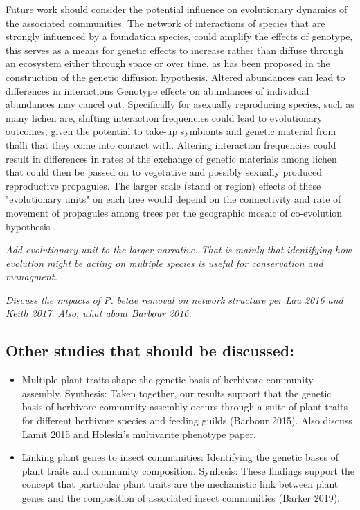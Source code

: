 \documentclass[11pt,twocolumn,twoside,lineno]{pnas-new}
\begin{document}
Future work should consider the potential influence on evolutionary
dynamics of the associated communities. The network of interactions of
species that are strongly influenced by a foundation species, could
amplify the effects of genotype, this serves as a means for genetic
effects to increase rather than diffuse through an ecosystem either
through space or over time, as has been proposed in the construction
of the genetic diffusion hypothesis. Altered abundances can lead to
differences in interactions Genotype effects on abundances of
individual abundances may cancel out. Specifically for asexually
reproducing species, such as many lichen are, shifting interaction
frequencies could lead to evolutionary outcomes, given the potential
to take-up symbionts and genetic material from thalli that they come
into contact with. Altering interaction frequencies could result in
differences in rates of the exchange of genetic materials among lichen
that could then be passed on to vegetative and possibly sexually
produced reproductive propagules. The larger scale (stand or region)
effects of these "evolutionary units" on each tree would depend on the
connectivity and rate of movement of propagules among trees per the
geographic mosaic of co-evolution hypothesis \cite{Barbour2009c,
  Thompson2013}.


\textit{Add evolutionary unit to the larger narrative. That is mainly
  that identifying how evolution might be acting on multiple species
  is useful for conservation and managment.}


\textit{Discuss the impacts of P. betae removal on network structure
  per Lau 2016 and Keith 2017. Also, what about Barbour 2016.}


\subsection*{Other studies that should be discussed:}

\begin{itemize}
\item Multiple plant traits shape the genetic basis of herbivore
  community assembly. Synthesis: Taken together, our results support
  that the genetic basis of herbivore community assembly occurs
  through a suite of plant traits for different herbivore species and
  feeding guilds (Barbour 2015). Also discuss Lamit 2015 and Holeski's
  multivarite phenotype paper.
\item Linking plant genes to insect communities:  Identifying the
  genetic bases of plant traits and community composition. Synhesis:
  These findings support the concept that particular plant traits are
  the mechanistic link between plant genes and the composition of
  associated insect communities (Barker 2019).
\end{itemize}
\end{document}
